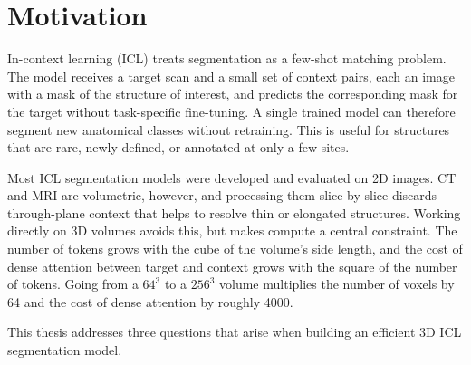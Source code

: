 \documentclass[hidelinks, a4paper, 12pt, ngerman, english]{article}  %
\begin{document}
\tableofcontents
\section{Motivation}\label{sec:motivation}

In-context learning (ICL) treats segmentation as a few-shot matching problem.
The model receives a target scan and a small set of context pairs, each an
image with a mask of the structure of interest, and predicts the corresponding
mask for the target without task-specific fine-tuning. A single trained model
can therefore segment new anatomical classes without retraining. This is useful
for structures that are rare, newly defined, or annotated at only a few sites.

Most ICL segmentation models were developed and evaluated on 2D images. CT and
MRI are volumetric, however, and processing them slice by slice discards
through-plane context that helps to resolve thin or elongated structures.
Working directly on 3D volumes avoids this, but makes compute a central
constraint. The number of tokens grows with the cube of the volume's side
length, and the cost of dense attention between target and context grows with
the square of the number of tokens. Going from a $64^3$ to a $256^3$ volume
multiplies the number of voxels by 64 and the cost of dense attention by
roughly 4000.

This thesis addresses three questions that arise when building an efficient
3D ICL segmentation model.
\end{document}
